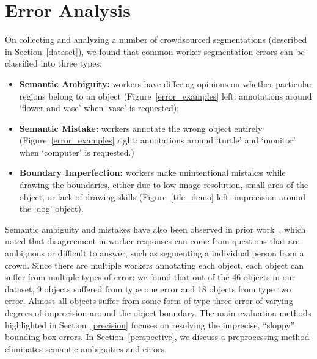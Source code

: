 \vspace{-3pt}
\section{Error Analysis\label{sec:error}}
\par On collecting and analyzing a number of crowdsourced segmentations (described in Section~\ref{dataset}), we found that common worker segmentation errors can be classified into three types: 
\begin{itemize}
	\item \textbf{Semantic Ambiguity:} workers have differing opinions on whether particular regions belong to an object (Figure~\ref{error_examples} left: annotations around `flower and vase' when `vase' is requested); \item \textbf{Semantic Mistake:} workers annotate the wrong object entirely (Figure~\ref{error_examples} right: annotations around `turtle' and `monitor' when `computer' is requested.)
	\item \textbf{Boundary Imperfection:} workers make unintentional mistakes while drawing the boundaries, either due to low image resolution, small area of the object, or lack of drawing skills (Figure~\ref{tile_demo} left: imprecision around the `dog' object).
\end{itemize}
\par Semantic ambiguity and mistakes have also been observed in prior work~\cite{Sorokin2008,Lin2014,Gurari2018}, which noted that disagreement in worker responses can come from questions that are ambiguous or difficult to answer, such as segmenting a individual person from a crowd. Since there are multiple workers annotating each object, each object can suffer from multiple types of error: we found that out of the 46 objects in our dataset, 9 objects suffered from type one error and 18 objects from type two error. Almost all objects suffer from some form of type three error of varying degrees of imprecision around the object boundary. The main evaluation methods highlighted in Section~\ref{precision} focuses on resolving the imprecise, ``sloppy'' bounding box errors. In Section~\ref{perspective}, we discuss a preprocessing method eliminates semantic ambiguities and errors. %
